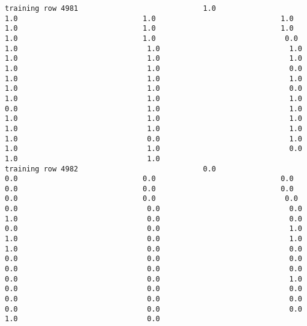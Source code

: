 \documentclass[11pt]{article}
\begin{document}
\begin{verbatim}
training row 4981                             1.0                             1.0                             1.0                             1.0                             1.0                             1.0                             1.0                             1.0                             1.0                              0.0                              1.0                              1.0                              1.0                              1.0                              1.0                              1.0                              1.0                              1.0                              0.0                              1.0                              1.0                              1.0                              1.0                              1.0                              0.0                              1.0                              1.0                              1.0                              0.0                              1.0                              1.0                              1.0                              1.0                              1.0                              1.0                              1.0                              1.0                              1.0                              0.0                              1.0                              1.0                              1.0                              0.0                              1.0                              1.0
training row 4982                             0.0                             0.0                             0.0                             0.0                             0.0                             0.0                             0.0                             0.0                             0.0                              0.0                              0.0                              0.0                              0.0                              1.0                              0.0                              0.0                              0.0                              0.0                              1.0                              1.0                              0.0                              1.0                              1.0                              0.0                              0.0                              0.0                              0.0                              0.0                              0.0                              0.0                              0.0                              0.0                              0.0                              1.0                              0.0                              0.0                              0.0                              0.0                              0.0                              0.0                              0.0                              0.0                              0.0                              1.0                              0.0

\end{verbatim}
\end{document}
